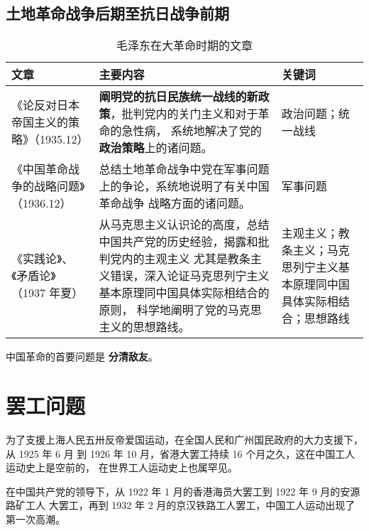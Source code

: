 \documentclass[10pt, UTF8]{ctexbook} %
\begin{document}
\subsection{土地革命战争后期至抗日战争前期}

\begin{table}[H]
    \centering
    \caption{毛泽东在大革命时期的文章}
    \begin{tabular}{p{}|p{}p{}}
        \hline 
        \textbf{文章} & \textbf{主要内容} & \textbf{关键词} \\
        \hline
        《论反对日本帝国主义的策略》（1935.12）&
        \textbf{阐明党的抗日民族统一战线的新政策}，批判党内的关门主义和对于革命的急性病，
        系统地解决了党的\textbf{政治策略}上的诸问题。
        & 政治问题；统一战线 \\ 
        \hline
        《中国革命战争的战略问题》（1936.12） &
        总结土地革命战争中党在军事问题上的争论，系统地说明了有关中国革命战争
        战略方面的诸问题。
        & 军事问题 \\ 
        \hline 
        《实践论》、《矛盾论》（1937 年夏）
        & 从马克思主义认识论的高度，总结中国共产党的历史经验，揭露和批判党内的主观主义
        尤其是教条主义错误，深入论证马克思列宁主义基本原理同中国具体实际相结合的原则，
        科学地阐明了党的马克思主义的思想路线。
        & 主观主义；教条主义；马克思列宁主义基本原理同中国具体实际相结合；思想路线 \\
        \hline 
    \end{tabular}
\end{table}

\begin{example}
    中国革命的首要问题是 \textbf{分清敌友}。
\end{example}

\section{罢工问题}

为了支援上海人民五卅反帝爱国运动，在全国人民和广州国民政府的大力支援下，从 1925 年 6 月
到 1926 年 10 月，省港大罢工持续 16 个月之久，这在中国工人运动史上是空前的，
在世界工人运动史上也属罕见。

在中国共产党的领导下，从 1922 年 1 月的香港海员大罢工到 1922 年 9 月的安源路矿工人
大罢工，再到 1932 年 2 月的京汉铁路工人罢工，中国工人运动出现了第一次高潮。



\end{document}

